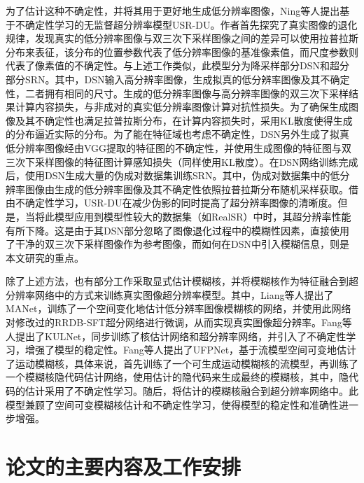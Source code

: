 为了估计这种不确定性，并将其用于更好地生成低分辨率图像，Ning等人提出基于不确定性学习的无监督超分辨率模型USR-DU。作者首先探究了真实图像的退化规律，发现真实的低分辨率图像与双三次下采样图像之间的差异可以使用拉普拉斯分布来表征，该分布的位置参数代表了低分辨率图像的基准像素值，而尺度参数则代表了像素值的不确定性。与上述工作类似，此模型分为降采样部分DSN和超分部分SRN。其中，DSN输入高分辨率图像，生成拟真的低分辨率图像及其不确定性，二者拥有相同的尺寸。生成的低分辨率图像与高分辨率图像的双三次下采样结果计算内容损失，与非成对的真实低分辨率图像计算对抗性损失。为了确保生成图像及其不确定性也满足拉普拉斯分布，在计算内容损失时，采用KL散度使得生成的分布逼近实际的分布。为了能在特征域也考虑不确定性，DSN另外生成了拟真低分辨率图像经由VGG提取的特征图的不确定性，并使用生成图像的特征图与双三次下采样图像的特征图计算感知损失（同样使用KL散度）。在DSN网络训练完成后，使用DSN生成大量的伪成对数据集训练SRN。其中，伪成对数据集中的低分辨率图像由生成的低分辨率图像及其不确定性依照拉普拉斯分布随机采样获取。借由不确定性学习，USR-DU在减少伪影的同时提高了超分辨率图像的清晰度。但是，当将此模型应用到模型性较大的数据集（如RealSR）中时，其超分辨率性能有所下降。这是由于其DSN部分忽略了图像退化过程中的模糊性因素，直接使用了干净的双三次下采样图像作为参考图像，而如何在DSN中引入模糊信息，则是本文研究的重点。

除了上述方法，也有部分工作采取显式估计模糊核，并将模糊核作为特征融合到超分辨率网络中的方式来训练真实图像超分辨率模型。其中，Liang等人提出了MANet，训练了一个空间变化地估计低分辨率图像模糊核的网络，并使用此网络对修改过的RRDB-SFT超分网络进行微调，从而实现真实图像超分辨率。Fang等人提出了KULNet，同步训练了核估计网络和超分辨率网络，并引入了不确定性学习，增强了模型的稳定性。Fang等人提出了UFPNet，基于流模型空间可变地估计了运动模糊核，具体来说，首先训练了一个可生成运动模糊核的流模型，再训练了一个模糊核隐代码估计网络，使用估计的隐代码来生成最终的模糊核，其中，隐代码的估计采用了不确定性学习。随后，将估计的模糊核融合到超分辨率网络中。此模型兼顾了空间可变模糊核估计和不确定性学习，使得模型的稳定性和准确性进一步增强。




\section{论文的主要内容及工作安排}